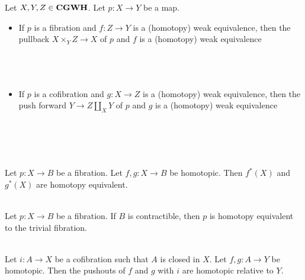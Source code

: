 \documentclass[a4paper]{article}
\begin{document}
\begin{prp}{}{} Let $X,Y,Z\in\bold{CGWH}$. Let $p:X\to Y$ be a map. 
\begin{itemize}
\item If $p$ is a fibration and $f:Z\to Y$ is a (homotopy) weak equivalence, then the pullback $X\times_YZ\to X$ of $p$ and $f$ is a (homotopy) weak equivalence \\~\\
\\~\\
\item If $p$ is a cofibration and $g:X\to Z$ is a (homotopy) weak equivalence, then the push forward $Y\to Z\coprod_XY$ of $p$ and $g$ is a (homotopy) weak equivalence \\~\\
\\~\\
\end{itemize}
\end{prp}

\begin{prp}{}{}\\
Let $p:X\to B$ be a fibration. Let $f,g:X\to B$ be homotopic. Then $f^\ast(X)$ and $g^\ast(X)$ are homotopy equivalent. 
\end{prp}

\begin{crl}{}{}\\
Let $p:X\to B$ be a fibration. If $B$ is contractible, then $p$ is homotopy equivalent to the trivial fibration. 
\end{crl}

\begin{prp}{}{}\\
Let $i:A\to X$ be a cofibration such that $A$ is closed in $X$. Let $f,g:A\to Y$ be homotopic. Then the pushouts of $f$ and $g$ with $i$ are homotopic relative to $Y$. 
\end{prp}
\end{document}

